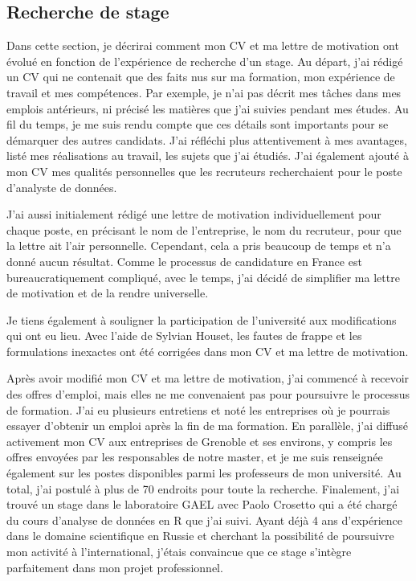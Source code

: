 \documentclass[12pt]{article}
\begin{document}
\subsection{Recherche de stage}

Dans cette section, je décrirai comment mon CV et ma lettre de
motivation ont évolué en fonction de l'expérience de recherche d'un
stage. Au départ, j'ai rédigé un CV qui ne contenait que des faits nus
sur ma formation, mon expérience de travail et mes compétences. Par
exemple, je n'ai pas décrit mes tâches dans mes emplois antérieurs, ni
précisé les matières que j'ai suivies pendant mes études. Au fil du
temps, je me suis rendu compte que ces détails sont importants pour se
démarquer des autres candidats. J'ai réfléchi plus attentivement à mes
avantages, listé mes réalisations au travail, les sujets que j'ai
étudiés. J'ai également ajouté à mon CV mes qualités personnelles que
les recruteurs recherchaient pour le poste d'analyste de données.

J'ai aussi initialement rédigé une lettre de motivation individuellement
pour chaque poste, en précisant le nom de l'entreprise, le nom du
recruteur, pour que la lettre ait l'air personnelle. Cependant, cela a
pris beaucoup de temps et n'a donné aucun résultat. Comme le processus
de candidature en France est bureaucratiquement compliqué, avec le
temps, j'ai décidé de simplifier ma lettre de motivation et de la rendre
universelle.

Je tiens également à souligner la participation de l'université aux
modifications qui ont eu lieu. Avec l'aide de Sylvian Houset, les fautes
de frappe et les formulations inexactes ont été corrigées dans mon CV et
ma lettre de motivation.

Après avoir modifié mon CV et ma lettre de motivation, j'ai commencé à
recevoir des offres d'emploi, mais elles ne me convenaient pas pour
poursuivre le processus de formation. J'ai eu plusieurs entretiens et
noté les entreprises où je pourrais essayer d'obtenir un emploi après la
fin de ma formation. En parallèle, j'ai diffusé activement mon CV aux
entreprises de Grenoble et ses environs, y compris les offres envoyées
par les responsables de notre master, et je me suis renseignée également
sur les postes disponibles parmi les professeurs de mon université. Au
total, j'ai postulé à plus de 70 endroits pour toute la recherche.
Finalement, j'ai trouvé un stage dans le laboratoire GAEL avec Paolo
Crosetto qui a été chargé du cours d'analyse de données en R que j'ai
suivi. Ayant déjà 4 ans d'expérience dans le domaine scientifique en
Russie et cherchant la possibilité de poursuivre mon activité à
l'international, j'étais convaincue que ce stage s'intègre parfaitement
dans mon projet professionnel.
\end{document}
